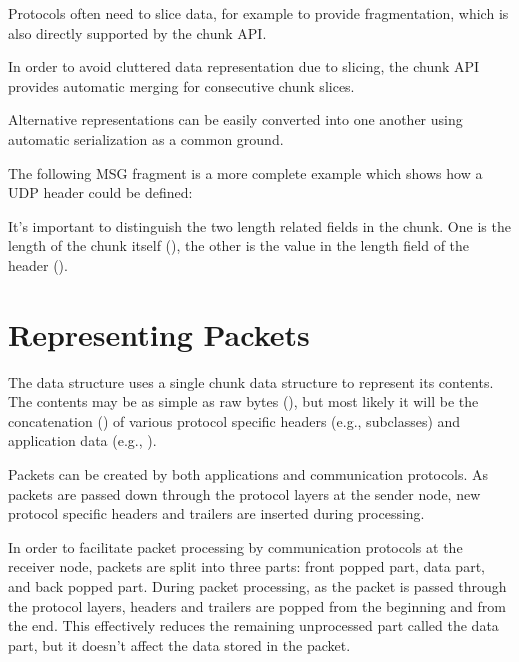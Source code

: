 
Protocols often need to slice data, for example to provide fragmentation, which
is also directly supported by the chunk API.


In order to avoid cluttered data representation due to slicing, the chunk API
provides automatic merging for consecutive chunk slices.


Alternative representations can be easily converted into one another using
automatic serialization as a common ground.


The following MSG fragment is a more complete example which shows how a UDP
header could be defined:


It's important to distinguish the two length related fields in the
 chunk. One is the length of the chunk itself
(), the other is the value in the length field of the header
().

\section{Representing Packets}

The  data structure uses a single chunk data structure to
represent its contents. The contents may be as simple as raw bytes
(), but most likely it will be the concatenation
() of various protocol specific headers (e.g.,
 subclasses) and application data (e.g.,
).

Packets can be created by both applications and communication protocols. As
packets are passed down through the protocol layers at the sender node, new
protocol specific headers and trailers are inserted during processing.


In order to facilitate packet processing by communication protocols at the
receiver node, packets are split into three parts: front popped part, data part,
and back popped part. During packet processing, as the packet is passed through
the protocol layers, headers and trailers are popped from the beginning and from
the end. This effectively reduces the remaining unprocessed part called the data
part, but it doesn't affect the data stored in the packet.

